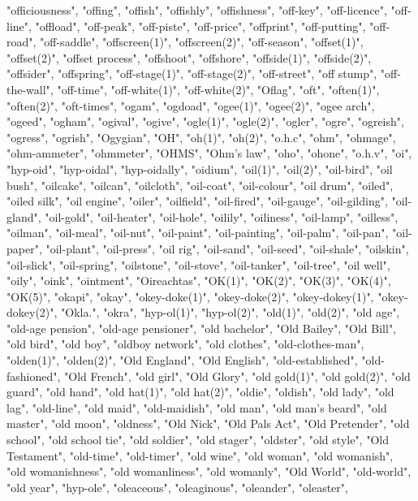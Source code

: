 "officiousness",
"offing",
"offish",
"offishly",
"offishness",
"off-key",
"off-licence",
"off-line",
"offload",
"off-peak",
"off-piste",
"off-price",
"offprint",
"off-putting",
"off-road",
"off-saddle",
"offscreen(1)",
"offscreen(2)",
"off-season",
"offset(1)",
"offset(2)",
"offset process",
"offshoot",
"offshore",
"offside(1)",
"offside(2)",
"offsider",
"offspring",
"off-stage(1)",
"off-stage(2)",
"off-street",
"off stump",
"off-the-wall",
"off-time",
"off-white(1)",
"off-white(2)",
"Oflag",
"oft",
"often(1)",
"often(2)",
"oft-times",
"ogam",
"ogdoad",
"ogee(1)",
"ogee(2)",
"ogee arch",
"ogeed",
"ogham",
"ogival",
"ogive",
"ogle(1)",
"ogle(2)",
"ogler",
"ogre",
"ogreish",
"ogress",
"ogrish",
"Ogygian",
"OH",
"oh(1)",
"oh(2)",
"o.h.c",
"ohm",
"ohmage",
"ohm-ammeter",
"ohmmeter",
"OHMS",
"Ohm's law",
"oho",
"ohone",
"o.h.v",
"oi",
"hyp-oid",
"hyp-oidal",
"hyp-oidally",
"oidium",
"oil(1)",
"oil(2)",
"oil-bird",
"oil bush",
"oilcake",
"oilcan",
"oilcloth",
"oil-coat",
"oil-colour",
"oil drum",
"oiled",
"oiled silk",
"oil engine",
"oiler",
"oilfield",
"oil-fired",
"oil-gauge",
"oil-gilding",
"oil-gland",
"oil-gold",
"oil-heater",
"oil-hole",
"oilily",
"oiliness",
"oil-lamp",
"oilless",
"oilman",
"oil-meal",
"oil-nut",
"oil-paint",
"oil-painting",
"oil-palm",
"oil-pan",
"oil-paper",
"oil-plant",
"oil-press",
"oil rig",
"oil-sand",
"oil-seed",
"oil-shale",
"oilskin",
"oil-slick",
"oil-spring",
"oilstone",
"oil-stove",
"oil-tanker",
"oil-tree",
"oil well",
"oily",
"oink",
"ointment",
"Oireachtas",
"OK(1)",
"OK(2)",
"OK(3)",
"OK(4)",
"OK(5)",
"okapi",
"okay",
"okey-doke(1)",
"okey-doke(2)",
"okey-dokey(1)",
"okey-dokey(2)",
"Okla.",
"okra",
"hyp-ol(1)",
"hyp-ol(2)",
"old(1)",
"old(2)",
"old age",
"old-age pension",
"old-age pensioner",
"old bachelor",
"Old Bailey",
"Old Bill",
"old bird",
"old boy",
"oldboy network",
"old clothes",
"old-clothes-man",
"olden(1)",
"olden(2)",
"Old England",
"Old English",
"old-established",
"old-fashioned",
"Old French",
"old girl",
"Old Glory",
"old gold(1)",
"old gold(2)",
"old guard",
"old hand",
"old hat(1)",
"old hat(2)",
"oldie",
"oldish",
"old lady",
"old lag",
"old-line",
"old maid",
"old-maidish",
"old man",
"old man's beard",
"old master",
"old moon",
"oldness",
"Old Nick",
"Old Pals Act",
"Old Pretender",
"old school",
"old school tie",
"old soldier",
"old stager",
"oldster",
"old style",
"Old Testament",
"old-time",
"old-timer",
"old wine",
"old woman",
"old womanish",
"old womanishness",
"old womanliness",
"old womanly",
"Old World",
"old-world",
"old year",
"hyp-ole",
"oleaceous",
"oleaginous",
"oleander",
"oleaster",

